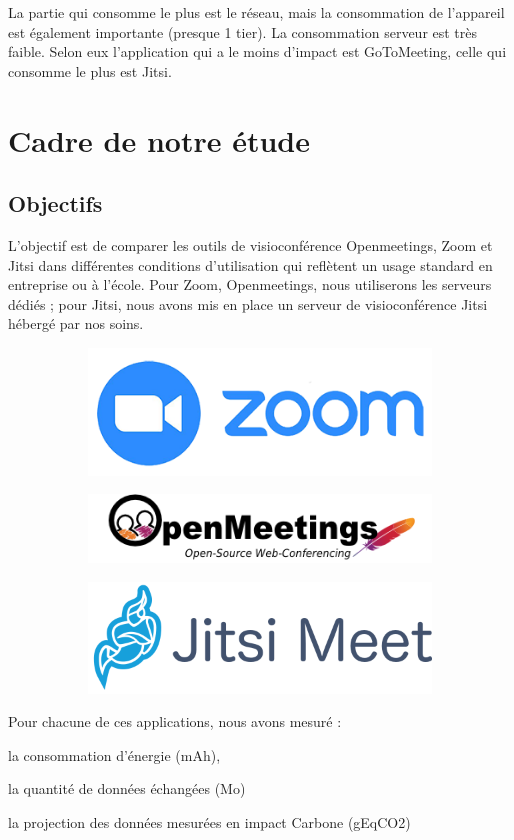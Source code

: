 \documentclass[11pt,a4paper]{report}
\begin{document}
La partie qui consomme le plus est le réseau, mais la consommation de l'appareil est également importante (presque 1 tier). La consommation serveur est très faible. Selon eux l'application qui a le moins d'impact est GoToMeeting, celle qui consomme le plus est Jitsi.

\chapter{Cadre de notre étude}
\section{Objectifs}
L'objectif est de comparer les outils de visioconférence Openmeetings, Zoom et Jitsi dans différentes conditions d'utilisation qui reflètent un usage standard en entreprise ou à l'école. Pour Zoom, Openmeetings, nous utiliserons les serveurs dédiés ; pour Jitsi, nous avons mis en place un serveur de visioconférence Jitsi hébergé par nos soins.

\begin{figure}[h]
\begin{subfigure}
  \centering
  \includegraphics[width=.3\linewidth]{zoom-logo (1).png}
\end{subfigure}
\begin{subfigure}
  \centering
  \includegraphics[width=.3\linewidth]{logo.png}
\end{subfigure}
\begin{subfigure}
  \centering
  \includegraphics[width=.3\linewidth]{logo-jitsi-meet.png}
\end{subfigure}
\end{figure}

Pour chacune de ces applications, nous avons mesuré :
\bi \item la consommation d’énergie (mAh),
\item la quantité de données échangées (Mo)
\item la projection des données mesurées en impact Carbone (gEqCO2)
\ei
\end{document}
